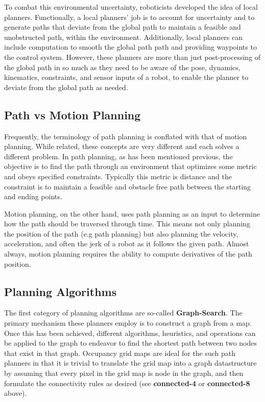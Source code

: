 To combat this environmental uncertainty, roboticists developed the idea of local planners. Functionally, a local planners' job is to account for uncertainty and to generate paths that deviate from the global path to maintain a feasible and unobstructed path, within the environment. Additionally, local planners can include computation to smooth the global path path and providing waypoints to the control system. However, these planners are more than just post-processing of the global path in so much as they need to be aware of the pose, dynamics, kinematics, constraints, and sensor inputs of a robot, to enable the planner to deviate from the global path as needed.

\subsection{Path vs Motion Planning}
Frequently, the terminology of path planning is conflated with that of motion planning. While related, these concepts are very different and each solves a different problem. In path planning, as has been mentioned previous, the objective is to find the path through an environment that optimizes some metric and obeys specified constraints. Typically this metric is distance and the constraint is to maintain a feasible and obstacle free path between the starting and ending points. 

Motion planning, on the other hand, uses path planning as an input to determine how the path should be traversed through time. This means not only planning the position of the path (e.g path planning) but also planning the velocity, acceleration, and often the jerk of a robot as it follows the given path. Almost always, motion planning requires the ability to compute derivatives of the path position. 

\subsection{Planning Algorithms}

The first category of planning algorithms are so-called \textbf{Graph-Search}. The primary mechanism these planners employ is to construct a graph from a map. Once this has been achieved, different algorithms, heuristics, and operations can be applied to the graph to endeavor to find the shortest path between two nodes that exist in that graph. Occupancy grid maps are ideal for the such path planners in that it is trivial to translate the grid map into a graph datastructure by assuming that every pixel in the grid map is node in the graph, and then formulate the connectivity rules as desired (see \textbf{connected-4} or \textbf{connected-8} above). 

